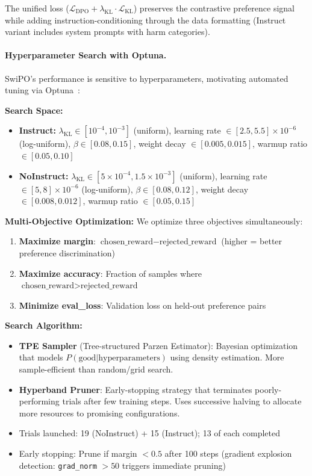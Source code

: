 The unified loss ($\mathcal{L}_{\text{DPO}} + \lambda_{\text{KL}} \cdot \mathcal{L}_{\text{KL}}$) preserves the contrastive preference signal while adding instruction-conditioning through the data formatting (Instruct variant includes system prompts with harm categories).

\paragraph{Hyperparameter Search with Optuna.} SwiPO's performance is sensitive to hyperparameters, motivating automated tuning via Optuna~\cite{akiba2019optuna}:

\textbf{Search Space:}
\begin{itemize}[leftmargin=*]
    \item \textbf{Instruct:} $\lambda_{\text{KL}} \in [10^{-4}, 10^{-3}]$ (uniform), learning rate $\in [2.5, 5.5] \times 10^{-6}$ (log-uniform), $\beta \in [0.08, 0.15]$, weight decay $\in [0.005, 0.015]$, warmup ratio $\in [0.05, 0.10]$
    \item \textbf{NoInstruct:} $\lambda_{\text{KL}} \in [5 \times 10^{-4}, 1.5 \times 10^{-3}]$ (uniform), learning rate $\in [5, 8] \times 10^{-6}$ (log-uniform), $\beta \in [0.08, 0.12]$, weight decay $\in [0.008, 0.012]$, warmup ratio $\in [0.05, 0.15]$
\end{itemize}

\textbf{Multi-Objective Optimization:} We optimize three objectives simultaneously:
\begin{enumerate}[leftmargin=*]
    \item \textbf{Maximize margin}: $\text{chosen\_reward} - \text{rejected\_reward}$ (higher = better preference discrimination)
    \item \textbf{Maximize accuracy}: Fraction of samples where $\text{chosen\_reward} > \text{rejected\_reward}$
    \item \textbf{Minimize eval\_loss}: Validation loss on held-out preference pairs
\end{enumerate}

\textbf{Search Algorithm:}
\begin{itemize}[leftmargin=*]
    \item \textbf{TPE Sampler} (Tree-structured Parzen Estimator): Bayesian optimization that models $P(\text{good} | \text{hyperparameters})$ using density estimation. More sample-efficient than random/grid search.
    \item \textbf{Hyperband Pruner}: Early-stopping strategy that terminates poorly-performing trials after few training steps. Uses successive halving to allocate more resources to promising configurations.
    \item Trials launched: 19 (NoInstruct) + 15 (Instruct); 13 of each completed
    \item Early stopping: Prune if margin $< 0.5$ after 100 steps (gradient explosion detection: \texttt{grad\_norm} $> 50$ triggers immediate pruning)
\end{itemize}

